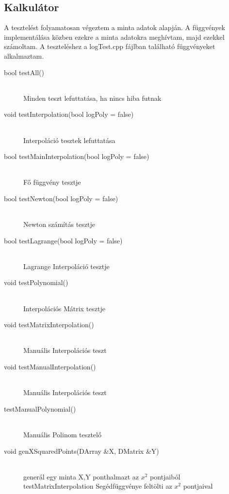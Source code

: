 \subsection{Kalkulátor}
	A tesztelést folyamatosan végeztem a minta adatok alapján. A függvények implementálása közben ezekre a minta adatokra meghívtam, majd ezekkel számoltam. A teszteléshez a logTest.cpp fájlban található függvényeket alkalmaztam. 
	\begin{description}
		\item[bool testAll()] \hfill \\ 
			Minden teszt lefuttatása, ha nincs hiba futnak
		\item[void testInterpolation(bool logPoly = false)] \hfill \\ 
			Interpoláció tesztek lefuttatása
		\item[bool testMainInterpolation(bool logPoly = false)] \hfill \\ 
			Fő függvény tesztje
		\item[bool testNewton(bool logPoly = false)] \hfill \\ 
			Newton számítás tesztje
		\item[bool testLagrange(bool logPoly = false)] \hfill \\ 
			Lagrange Interpoláció tesztje
		\item[void testPolynomial()] \hfill \\ 
			Interpolációs Mátrix tesztje
		\item[void testMatrixInterpolation()] \hfill \\ 
			Manuális Interpolációs teszt
		\item[void testManualInterpolation()] \hfill \\ 
			Manuális Interpolációs teszt

		\item[testManualPolynomial()] \hfill \\ 
			Manuális Polinom tesztelő 
		\item[void genXSquaredPoints(DArray \&X, DMatrix \&Y)] \hfill \\ 
			generál egy minta X,Y ponthalmazt az $x^{2}$ 
			pontjaiból
		testMatrixInterpolation Segédfüggvénye
		feltölti az $x^{2}$ pontjaival 
	\end{description}
